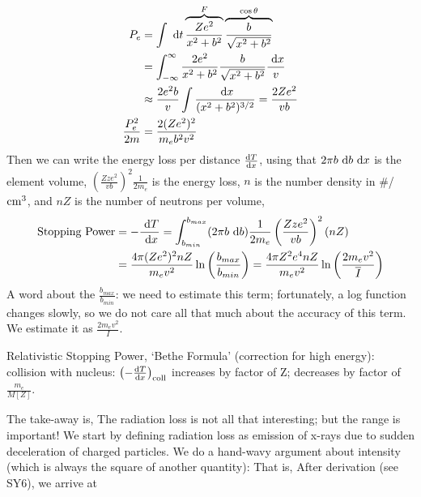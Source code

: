 \documentclass{school-22.101-notes}
\begin{document}
\begin{align}
    P_e &= \int \mbox{ }\mathrm{d} t \overbrace{\frac{Ze^2}{x^2 + b^2}}^{F} \overbrace{\frac{b}{\sqrt{x^2 + b^2}}}^{\cos \theta} \\
    &= \int_{-\infty}^{\infty} \frac{2e^2}{x^2+b^2} \frac{b}{\sqrt{x^2 + b^2}} \frac{\mbox{ }\mathrm{d} x}{v} \\
    &\approx \frac{2e^2 b}{v} \int \frac{\mbox{ }\mathrm{d} x}{(x^2 + b^2)^{3/2}} = \frac{2Ze^2}{vb} \\
    \frac{P_e^2}{2m} &= \frac{2 (Ze^2)^2}{m_e b^2 v^2} 
\end{align}
Then we can write the energy loss per distance $\frac{\mathrm{d}T}{\mathrm{d}x}$, using that $2 \pi b \mbox{ }\mathrm{d} b \mbox{ }\mathrm{d} x$ is the element volume, $\left(\frac{Zze^2}{v b} \right)^2 \frac{1}{2m_e}$ is the energy loss, $n$ is the number density in \#/$\mathrm{cm}^3$, and $nZ$ is the number of neutrons per volume, 
\begin{align}
    \mbox{Stopping Power} &= - \frac{\mbox{ }\mathrm{d} T}{\mbox{ }\mathrm{d} x} = \int_{b_{min}}^{b_{max}} (2 \pi b \mbox{ }\mathrm{d} b) \frac{1}{2m_e} \left( \frac{Zze^2}{vb} \right)^2 (n Z) \\
    &= \frac{4 \pi (Ze^2)^2nZ }{m_e v^2 } \ln \left( \frac{b_{max}}{b_{min}} \right) = \frac{4 \pi Z^2 e^4 n Z}{m_e v^2} \ln \left( \frac{2 m_e v^2}{\left.\overline{I} \right.} \right) 
\end{align}
A word about the $\frac{b_{max}}{b_{min}}$: we need to estimate this term; fortunately, a log function changes slowly, so we do not care all that much about the accuracy of this term. We estimate it as $\frac{2m_e v^2}{I}$. 

Relativistic Stopping Power, `Bethe Formula' (correction for high energy):
collision with nucleus: $\left( -\frac{\mathrm{d}T}{\mathrm{d}x} \right)_{\mathrm{coll}}$ increases by factor of Z; decreases by factor of $\frac{m_e}{M[Z]}$. 

The take-away is, 
The radiation loss is not all that interesting; but the range is important! We start by defining radiation loss as emission of x-rays due to sudden deceleration of charged particles. We do a hand-wavy argument about intensity (which is always the square of another quantity): 
That is,  
After derivation (see SY6), we arrive at 
\end{document}
